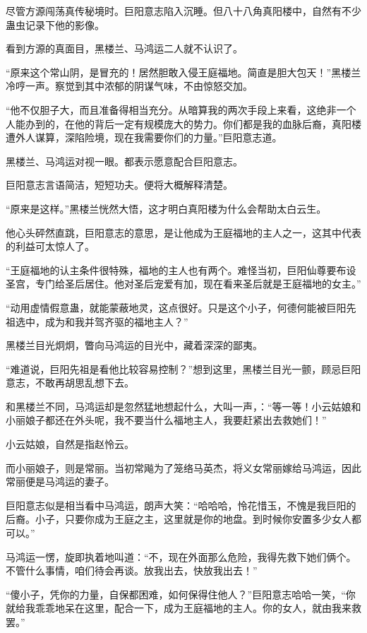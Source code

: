 \begin{this_body}
尽管方源闯荡真传秘境时。巨阳意志陷入沉睡。但八十八角真阳楼中，自然有不少蛊虫记录下他的影像。

看到方源的真面目，黑楼兰、马鸿运二人就不认识了。

“原来这个常山阴，是冒充的！居然胆敢入侵王庭福地。简直是胆大包天！”黑楼兰冷哼一声。察觉到其中浓郁的阴谋气味，不由惊怒交加。

“他不仅胆子大，而且准备得相当充分。从暗算我的两次手段上来看，这绝非一个人能办到的，在他的背后一定有规模庞大的势力。你们都是我的血脉后裔，真阳楼遭外人谋算，深陷险境，现在我需要你们的力量。”巨阳意志道。

黑楼兰、马鸿运对视一眼。都表示愿意配合巨阳意志。

巨阳意志言语简洁，短短功夫。便将大概解释清楚。

“原来是这样。”黑楼兰恍然大悟，这才明白真阳楼为什么会帮助太白云生。

他心头砰然直跳，巨阳意志的意思，是让他成为王庭福地的主人之一，这其中代表的利益可太惊人了。

“王庭福地的认主条件很特殊，福地的主人也有两个。难怪当初，巨阳仙尊要布设圣宫，专门给圣后居住。他对圣后宠爱有加，现在看来圣后就是王庭福地的女主。”

“动用虚情假意蛊，就能蒙蔽地灵，这点很好。只是这个小子，何德何能被巨阳先祖选中，成为和我并驾齐驱的福地主人？”

黑楼兰目光炯炯，瞥向马鸿运的目光中，藏着深深的鄙夷。

“难道说，巨阳先祖是看他比较容易控制？”想到这里，黑楼兰目光一颤，顾忌巨阳意志，不敢再胡思乱想下去。

和黑楼兰不同，马鸿运却是忽然猛地想起什么，大叫一声，：“等一等！小云姑娘和小丽娘子都还在外头呢，我不要当什么福地主人，我要赶紧出去救她们！”

小云姑娘，自然是指赵怜云。

而小丽娘子，则是常丽。当初常飚为了笼络马英杰，将义女常丽嫁给马鸿运，因此常丽便是马鸿运的妻子。

巨阳意志似是相当看中马鸿运，朗声大笑：“哈哈哈，怜花惜玉，不愧是我巨阳的后裔。小子，只要你成为王庭之主，这里就是你的地盘。到时候你安置多少女人都可以。”

马鸿运一愣，旋即执着地叫道：“不，现在外面那么危险，我得先救下她们俩个。不管什么事情，咱们待会再谈。放我出去，快放我出去！”

“傻小子，凭你的力量，自保都困难，如何保得住他人？”巨阳意志哈哈一笑，“你就给我乖乖地呆在这里，配合一下，成为王庭福地的主人。你的女人，就由我来救罢。”


\end{this_body}
